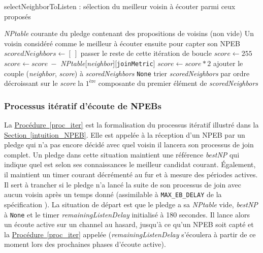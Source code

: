 \documentclass[]{report}
\newcommand{\wordlink}[2]{\hyperref[#2]{#1~\ref{#2}}}
\begin{document}
\begin{algorithm}[!h]
\caption{selectNeighborToListen : sélection du meilleur voisin à écouter parmi ceux proposés}
\begin{algorithmic}[1]
\Require \textit{NPtable} courante du pledge contenant des propositions de voisins (non vide)
\Ensure Un voisin considéré comme le meilleur à écouter ensuite pour capter son NPEB
\State $scoredNeighbors \leftarrow [\ ]$
\State passer le reste de cette itération de boucle
\Else
\State $score \leftarrow 255$
\State $score \leftarrow score\ - $ \textit{NPtable}[\textit{neighbor}][\texttt{joinMetric}]
\State $score \leftarrow score * 2$
\EndIf
\State ajouter le couple (\textit{neighbor}, \textit{score}) à \textit{scoredNeighbors}
\EndIf
\EndFor
{}
\State\Return \texttt{None}
\EndIf
\State trier \textit{scoredNeighbors} par ordre décroissant sur le \textit{score}
\State\Return la $1^{\text{ère}}$ composante du premier élément de \textit{scoredNeighbors}
\end{algorithmic}
\label{proc_listen}
\end{algorithm}


\subsubsection{Processus itératif d'écoute de NPEBs}

La \wordlink{Procédure}{proc_iter} est la formalisation du processus itératif illustré dans la \wordlink{Section}{intuition_NPEB}. Elle est appelée à la réception d'un NPEB par un pledge qui n'a pas encore décidé avec quel voisin il lancera son processus de join complet. Un pledge dans cette situation maintient une référence \textit{bestNP} qui indique quel est selon ses connaissances le meilleur candidat courant. Également, il maintient un timer courant décrémenté au fur et à mesure des périodes actives. Il sert à trancher si le pledge n'a lancé la suite de son processus de join avec aucun voisin après un temps donné (assimilable à \texttt{MAX\_EB\_DELAY} de la spécification \cite{rfc8180}). La situation de départ est que le pledge a sa \textit{NPtable} vide, \textit{bestNP} à \texttt{None} et le timer \textit{remainingListenDelay} initialisé à 180 secondes. Il lance alors un écoute active sur un channel au hasard, jusqu'à ce qu'un NPEB soit capté et la \wordlink{Procédure}{proc_iter} appelée (\textit{remainingListenDelay} s'écoulera à partir de ce moment lors des prochaines phases d'écoute active).\\
\end{document}
